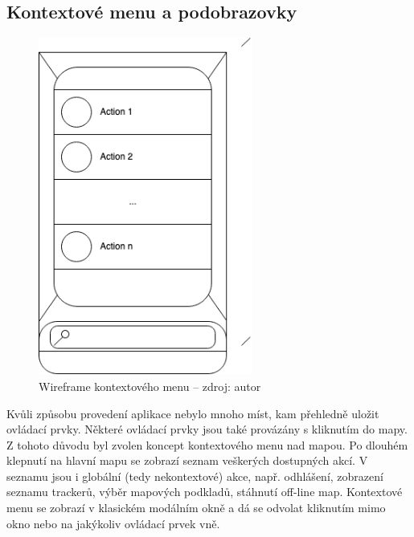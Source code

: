 \subsection{Kontextové menu a podobrazovky}

\begin{figure}[H]
	\begin{center}
		\includegraphics[width=70mm]{img/wf_contextmenu.png}
	\end{center}
	\caption[Wireframe kontextového menu]{Wireframe kontextového menu -- zdroj: autor}
\end{figure}

Kvůli způsobu provedení aplikace nebylo mnoho míst, kam přehledně uložit ovládací prvky. Některé ovládací prvky jsou také provázány s kliknutím do mapy. Z tohoto důvodu byl zvolen koncept kontextového menu nad mapou. Po dlouhém klepnutí na hlavní mapu se zobrazí seznam veškerých dostupných akcí. V seznamu jsou i globální (tedy nekontextové) akce, např. odhlášení, zobrazení seznamu trackerů, výběr mapových podkladů, stáhnutí off-line map. Kontextové menu se zobrazí v klasickém modálním okně a dá se odvolat kliknutím mimo okno nebo na jakýkoliv ovládací prvek vně.

